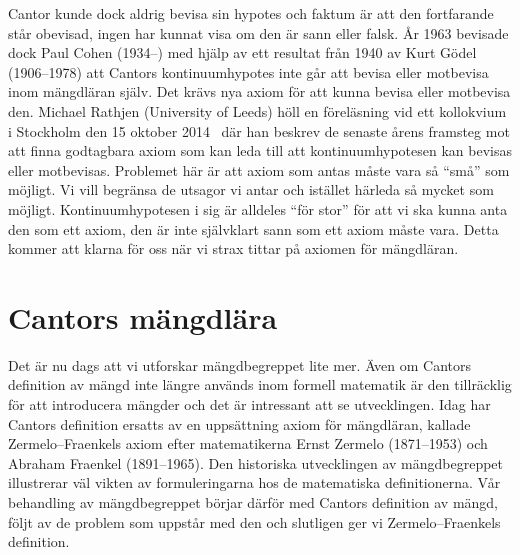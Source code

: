 Cantor kunde dock aldrig bevisa sin hypotes och faktum är att den fortfarande 
står obevisad, ingen har kunnat visa om den är sann eller falsk.
År 1963 bevisade dock Paul Cohen (1934--) med hjälp av ett resultat från 1940 
av Kurt Gödel (1906--1978) att Cantors kontinuumhypotes inte går att bevisa 
eller motbevisa inom mängdläran själv.
Det krävs nya axiom för att kunna bevisa eller motbevisa den.
Michael Rathjen (University of Leeds) höll en föreläsning vid ett kollokvium 
i Stockholm den 15 oktober 2014~\cite{smcrathjen} där han beskrev de senaste 
årens framsteg mot att finna godtagbara axiom som kan leda till att 
kontinuumhypotesen kan bevisas eller motbevisas.
Problemet här är att axiom som antas måste vara så \enquote{små} som möjligt.  
Vi vill begränsa de utsagor vi antar och istället härleda så mycket som 
möjligt.
Kontinuumhypotesen i sig är alldeles \enquote{för stor} för att vi ska kunna 
anta den som ett axiom, den är inte självklart sann som ett axiom måste vara.
Detta kommer att klarna för oss när vi strax tittar på axiomen för mängdläran.


%


\section{Cantors mängdlära}

Det är nu dags att vi utforskar mängdbegreppet lite mer.
Även om Cantors definition av mängd inte längre används inom formell matematik 
är den tillräcklig för att introducera mängder och det är intressant att se 
utvecklingen.
Idag har Cantors definition ersatts av en uppsättning axiom för mängdläran,
kallade Zermelo--Fraenkels axiom efter matematikerna Ernst Zermelo (1871--1953)
och Abraham Fraenkel (1891--1965).
Den historiska utvecklingen av mängdbegreppet illustrerar väl vikten av 
formuleringarna hos de matematiska definitionerna.
Vår behandling av mängdbegreppet börjar därför med Cantors definition av mängd, 
följt av de problem som uppstår med den och slutligen ger vi Zermelo--Fraenkels 
definition.

